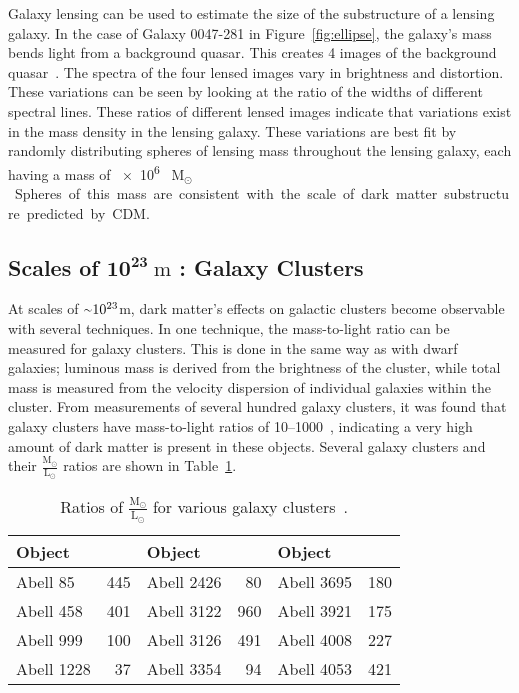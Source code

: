 Galaxy lensing can be used to estimate the size of the substructure of a lensing galaxy.
In the case of Galaxy 0047-281 in Figure~\ref{fig:ellipse}, the galaxy's mass bends light from a background quasar.
This creates 4 images of the background quasar~\cite{weak_lensing_quasar}.
The spectra of the four lensed images vary in brightness and distortion.
These variations can be seen by looking at the ratio of the widths of different spectral lines.
These ratios of different lensed images indicate that variations exist in the mass density in the lensing galaxy.
These variations are best fit by randomly distributing spheres of lensing mass throughout the lensing galaxy, each having a mass of \SI{e6}{ M${{}_\odot}$ }.
Spheres of this mass are consistent with the scale of dark matter substructure predicted by CDM.

\subsection[Scales of $10^{23}\:\text{m}$ : Galaxy Clusters]{Scales of $\mathbf{10^{23}}\:\text{m}$ : Galaxy Clusters}\label{dm_galclusters}
%
At scales of $\nicetilde 10^{23}$m, dark matter's effects on galactic clusters become observable with several techniques.
In one technique, the mass-to-light ratio can be measured for galaxy clusters.
This is done in the same way as with dwarf galaxies; luminous mass is derived from the brightness of the cluster, while total mass is measured from the velocity dispersion of individual galaxies within the cluster.
From measurements of several hundred galaxy clusters, it was found that galaxy clusters have mass-to-light ratios of \SIrange{10}{1000}{}~\cite{cluster_ml_ratios}, indicating a very high amount of dark matter is present in these objects.
Several galaxy clusters and their $\frac{\textrm{M}_\odot}{\textrm{L}_\odot}$ ratios are shown in Table~\ref{tab:cluster_ml_ratios}.

\begin{table}[h]
  \centering
  \caption[Ratios of $\frac{\textrm{M}_\odot}{\textrm{L}_\odot}$ for Various Galaxy Clusters]{
    Ratios of $\frac{\textrm{M}_\odot}{\textrm{L}_\odot}$ for various galaxy clusters~\cite{cluster_ml_ratios}.
    }
  \label{tab:cluster_ml_ratios}
  \begin{tabular}{l r | l r | l r}
    Object & \mlratio{} & Object & \mlratio{} & Object & \mlratio{} \\
    \hline
    Abell   85 & 445 & Abell 2426 &  80 & Abell 3695 & 180 \\
    Abell  458 & 401 & Abell 3122 & 960 & Abell 3921 & 175 \\
    Abell  999 & 100 & Abell 3126 & 491 & Abell 4008 & 227 \\
    Abell 1228 &  37 & Abell 3354 &  94 & Abell 4053 & 421 \\
  \end{tabular}
\end{table}
    
